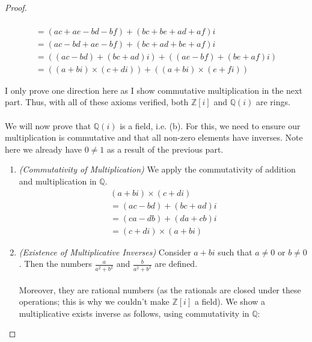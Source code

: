 \documentclass[12pt]{article}
\newenvironment{sol}[1][Solution]{\begin{trivlist}
\item[\hskip \labelsep {\bfseries #1:}]}{\end{trivlist}}
\begin{document}
\begin{sol}
\begin{proof}
\begin{enumerate}
\begin{equation}
\begin{aligned}
                    \\ = (ac + ae - bd - bf) + (bc + be + ad + af)i
                    \\ = (ac - bd + ae - bf) + (bc + ad + be + af)i
                    \\ = ((ac - bd) + (bc + ad)i) + ((ae - bf) + (be + af)i)
                    \\ = ((a + bi) \times (c + di)) + ((a + bi) \times (e + fi))
                \end{aligned}
            \end{equation}
        \end{enumerate}
        I only prove one direction here as I show commutative multiplication in the next part. Thus, with all of these axioms verified, both $\mathbb{Z}[i]$ and $\mathbb{Q}(i)$ are rings. \\ \\
        We will now prove that $\mathbb{Q}(i)$ is a field, i.e. (b). For this, we need to ensure our multiplication is commutative and that all non-zero elements have inverses. Note here we already have $0 \neq 1$ as a result of the previous part.
        \begin{enumerate}
            \item \textit{(Commutativity of Multiplication)}
            We apply the commutativity of addition and multiplication in $\mathbb{Q}$.
            \begin{equation}
                \begin{aligned}
                    (a + bi) \times (c + di) 
                    \\ = (ac - bd) + (bc + ad)i 
                    \\ = (ca - db) + (da + cb)i 
                    \\ = (c + di) \times (a + bi) 
                \end{aligned}
            \end{equation}
            \item \textit{(Existence of Multiplicative Inverses)}
            Consider $a + bi$ such that $a \neq 0$ or $b \neq 0$. Then the numbers $\frac{a}{a^2 + b^2}$ and $\frac{b}{a^2 + b^2}$ are defined. \\ \\
            Moreover, they are rational numbers (as the rationals are closed under these operations; this is why we couldn't make $\mathbb{Z}[i]$ a field). We show a multiplicative exists inverse as follows, using commutativity in $\mathbb{Q}$:

\end{enumerate}
\end{proof}
\end{sol}
\end{document}
